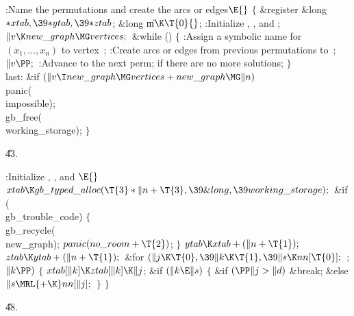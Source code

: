 \Y\B\4:Name the permutations and create the arcs or edges\X${}\E{}$\6
${}\{{}$\5
\1\&{register} \&{long} ${}{*}\\{xtab},\39{*}\\{ytab},\39{*}\\{ztab}{}$;\6
\&{long} \|m${}\K\T{0}{}$;\7
:Initialize , , and \X;\6
${}\|v\K\\{new\_graph}\MG\\{vertices};{}$\6
\&{while} ()\5
${}\{{}$\1\6
:Assign a symbolic name for $(x_1,\ldots,x_n)$ to vertex~\X;\6
:Create arcs or edges from previous permutations to~\X;\6
${}\|v\PP;{}$\6
:Advance to the next perm;  if there are no more
solutions\X;\6
\4${}\}{}$\2\6
\4\\{last}:\5
\&{if} ${}(\|v\I\\{new\_graph}\MG\\{vertices}+\\{new\_graph}\MG\|n){}$\1\5
\\{panic}(\\{impossible});\2\6
\\{gb\_free}(\\{working\_storage});\6
\4${}\}{}$\2\par
\U43.\fi

\B{}:Initialize , , and \X${}%
\E{}$\6
$\\{xtab}\K\\{gb\_typed\_alloc}(\T{3}*\|n+\T{3},\39\&{long},\39\\{working%
\_storage});{}$\6
\&{if} (\\{gb\_trouble\_code})\5
${}\{{}$\1\6
\\{gb\_recycle}(\\{new\_graph});\5
${}\\{panic}(\\{no\_room}+\T{2}){}$;\5
${}\}{}$\2\6
${}\\{ytab}\K\\{xtab}+(\|n+\T{1});{}$\6
${}\\{ztab}\K\\{ytab}+(\|n+\T{1});{}$\6
\&{for} ${}(\|j\K\T{0},\39\|k\K\T{1},\39\|s\K\\{nn}[\T{0}];{}$  ; ${}\|k\PP){}$%
\5
${}\{{}$\1\6
${}\\{xtab}[\|k]\K\\{ztab}[\|k]\K\|j{}$;\6
\&{if} ${}(\|k\E\|s){}$\5
${}\{{}$\1\6
\&{if} ${}(\PP\|j>\|d){}$\1\5
\&{break};\2\6
\&{else}\1\5
${}\|s\MRL{+{\K}}\\{nn}[\|j];{}$\2\6
\4${}\}{}$\2\6
\4${}\}{}$\2\par
\U48.\fi

